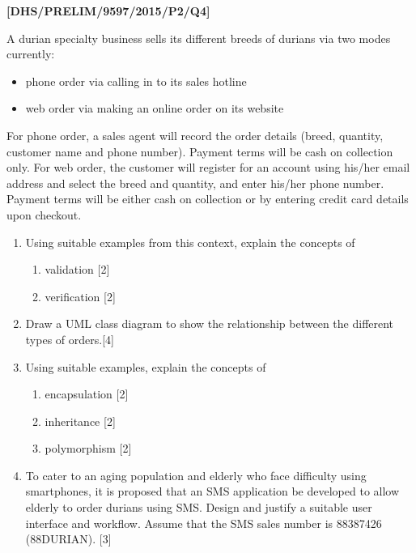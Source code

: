 \item \textbf{{[}DHS/PRELIM/9597/2015/P2/Q4{]} }

A durian specialty business sells its different breeds of durians
via two modes currently: 
\begin{itemize}
\item phone order via calling in to its sales hotline
\item web order via making an online order on its website 
\end{itemize}
For phone order, a sales agent will record the order details (breed,
quantity, customer name and phone number). Payment terms will be cash
on collection only. For web order, the customer will register for
an account using his/her email address and select the breed and quantity,
and enter his/her phone number. Payment terms will be either cash
on collection or by entering credit card details upon checkout.
\begin{enumerate}
\item Using suitable examples from this context, explain the concepts of
\begin{enumerate}
\item validation \hfill{}{[}2{]}
\item verification \hfill{}{[}2{]}
\end{enumerate}
\item Draw a UML class diagram to show the relationship between the different
types of orders.\hfill{}{[}4{]}
\item Using suitable examples, explain the concepts of 
\begin{enumerate}
\item encapsulation \hfill{}{[}2{]}
\item inheritance\hfill{} {[}2{]}
\item polymorphism \hfill{}{[}2{]}
\end{enumerate}
\item To cater to an aging population and elderly who face difficulty using
smartphones, it is proposed that an SMS application be developed to
allow elderly to order durians using SMS. Design and justify a suitable
user interface and workflow. Assume that the SMS sales number is 88387426
(88DURIAN).\hfill{} {[}3{]}
\end{enumerate}